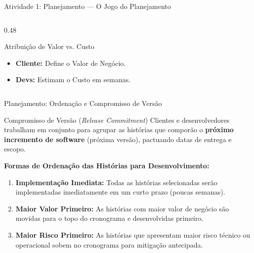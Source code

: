 \documentclass[aspectratio=169, 9pt]{beamer}
\begin{document}
\begin{frame}{Atividade 1: Planejamento --- O Jogo do Planejamento}
\begin{columns}[T]
    \begin{column}{0.48\textwidth}
      \begin{block}{Atribuição de Valor vs. Custo}
        \begin{itemize}
          \item \textbf{Cliente:} Define o Valor de Negócio.
          \item \textbf{Devs:} Estimam o Custo em semanas.
        \end{itemize}
      \end{block}
    \end{column}
  \end{columns}
\end{frame}

\begin{frame}{Planejamento: Ordenação e Compromisso de Versão}
  \begin{block}{Compromisso de Versão (\textit{Release Commitment})}
    Clientes e desenvolvedores trabalham em conjunto para agrupar as histórias que comporão o \textbf{próximo incremento de software} (próxima versão), pactuando datas de entrega e escopo.
  \end{block}

  \vspace{0.3cm}
  
  \textbf{Formas de Ordenação das Histórias para Desenvolvimento:}
  \begin{enumerate}
    \item \textbf{Implementação Imediata:} Todas as histórias selecionadas serão implementadas imediatamente em um curto prazo (poucas semanas).
    \item \textbf{Maior Valor Primeiro:} As histórias com maior valor de negócio são movidas para o topo do cronograma e desenvolvidas primeiro.
    \item \textbf{Maior Risco Primeiro:} As histórias que apresentam maior risco técnico ou operacional sobem no cronograma para mitigação antecipada.
  \end{enumerate}
\end{frame}
\end{document}
